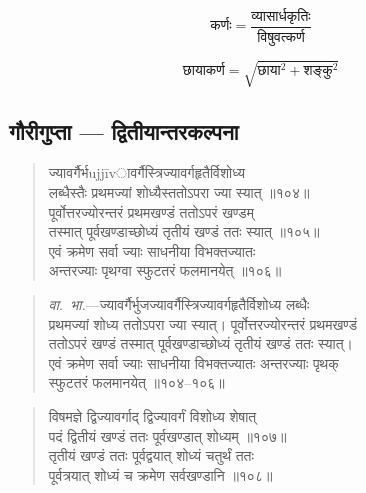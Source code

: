 \documentclass[11pt,a4paper]{article}
\newcommand{\dev}[1]{{\devanagarifont #1}}
\newenvironment{shloka}{%
  \begin{quote}
  \small
  \setlength{\leftmargin}{2em}
  \devanagarifont
}{\end{quote}}
\newenvironment{vyakhya}{%
  \begin{quote}
  \small
  \setlength{\leftmargin}{1em}
  \devanagarifont
}{\end{quote}}
\newcommand{\skt}[1]{{\devanagarifont #1}}
\begin{document}
\begin{equation}
\text{कर्णः} = \frac{\text{व्यासार्धकृतिः}}{\text{विषुवत्कर्ण}}
\end{equation}

\begin{equation}
\text{छायाकर्ण} = \sqrt{\text{छाया}^2 + \text{शङ्कु}^2}
\end{equation}

\subsection{\dev{गौरीगुप्ता — द्वितीयान्तरकल्पना}}

\begin{shloka}
\skt{ज्यावर्गैर्भujjīvावर्गैस्त्रिज्यावर्गहृतैर्विशोध्य}\\[0.3em]
\skt{लब्धैस्तैः प्रथमज्यां शोध्यैस्ततोऽपरा ज्या स्यात् ॥१०४॥}\\[0.3em]
\skt{पूर्वोत्तरज्योरन्तरं प्रथमखण्डं ततोऽपरं खण्डम्}\\[0.3em]
\skt{तस्मात् पूर्वखण्डाच्छोध्यं तृतीयं खण्डं ततः स्यात् ॥१०५॥}\\[0.3em]
\skt{एवं क्रमेण सर्वा ज्याः साधनीया विभक्तज्यातः}\\[0.3em]
\skt{अन्तरज्याः पृथग्वा स्फुटतरं फलमानयेत् ॥१०६॥}
\end{shloka}

\begin{vyakhya}
\textit{वा.~भा.}—\skt{ज्यावर्गैर्भुजज्यावर्गैस्त्रिज्यावर्गहृतैर्विशोध्य लब्धैः}\\
\skt{प्रथमज्यां शोध्य ततोऽपरा ज्या स्यात्। पूर्वोत्तरज्योरन्तरं प्रथमखण्डं}\\
\skt{ततोऽपरं खण्डं तस्मात् पूर्वखण्डाच्छोध्यं तृतीयं खण्डं ततः स्यात्।}\\
\skt{एवं क्रमेण सर्वा ज्याः साधनीया विभक्तज्यातः अन्तरज्याः पृथक्}\\
\skt{स्फुटतरं फलमानयेत् ॥१०४--१०६॥}
\end{vyakhya}

\begin{shloka}
\skt{विषमज्ञे द्विज्यावर्गाद् द्विज्यावर्गं विशोध्य शेषात्}\\[0.3em]
\skt{पदं द्वितीयं खण्डं ततः पूर्वखण्डात् शोध्यम् ॥१०७॥}\\[0.3em]
\skt{तृतीयं खण्डं ततः पूर्वद्वयात् शोध्यं चतुर्थं ततः}\\[0.3em]
\skt{पूर्वत्रयात् शोध्यं च क्रमेण सर्वखण्डानि ॥१०८॥}
\end{shloka}
\end{document}
